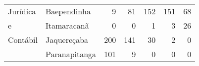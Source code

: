 \begin{table}[h]
\begin{tabular}{ll rrrrr}
    Jurídica        	& Baependinha             &                  9 &           81 &         152 &        151 &               68 \\ 
    e                   & Itamaracanã             &                  0 &            0 &           1 &          3 &               26 \\ 
	Contábil    		& Jaquereçaba             &                200 &          141 &          30 &          2 &                0 \\ 
                        & Paranapitanga           &                101 &            9 &           0 &          0 &                0 \\ 
   \bottomrule
\end{tabular}
\end{table}


